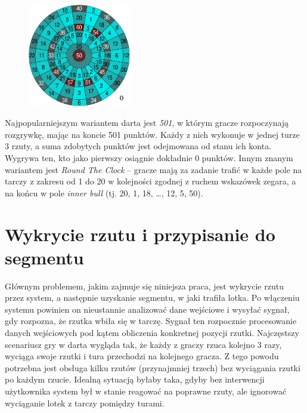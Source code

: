 \begin{figure}[h!]
\begin{center}
\includegraphics[width=0.4\textwidth]{obrazki/tarcza.pdf}
\end{center}
\label{tarcza_punktacja}
\end{figure} 

Najpopularniejszym wariantem darta jest \textit{501}, w którym gracze rozpoczynają rozgrywkę, mając na koncie 501 punktów. Każdy z nich wykonuje w jednej turze 3 rzuty, a suma zdobytych punktów jest odejmowana od stanu ich konta. Wygrywa ten, kto jako pierwszy osiągnie dokładnie 0 punktów. Innym znanym wariantem jest \textit{Round The Clock} -- gracze mają za zadanie trafić w każde pole na tarczy z zakresu od 1 do 20 w kolejności zgodnej z ruchem wskazówek zegara, a na końcu w pole \textit{inner bull} (tj. 20, 1, 18, \ldots, 12, 5, 50).

\section{Wykrycie rzutu i przypisanie do segmentu} \label{reprezentacja_pola}
Głównym problemem, jakim zajmuje się niniejsza praca, jest wykrycie rzutu przez system, a następnie uzyskanie segmentu, w jaki trafiła lotka. Po włączeniu systemu powinien on nieustannie analizować dane wejściowe i wysyłać sygnał, gdy rozpozna, że rzutka wbiła się w tarczę. Sygnał ten rozpocznie procesowanie danych wejściowych pod kątem obliczenia konkretnej pozycji rzutki. Najczęstszy scenariusz gry w darta wygląda tak, że każdy z graczy rzuca kolejno 3 razy, wyciąga swoje rzutki i tura przechodzi na kolejnego gracza. Z tego powodu potrzebna jest obsługa kilku rzutów (przynajmniej trzech) bez wyciągania rzutki po każdym rzucie. Idealną sytuacją byłaby taka, gdyby bez interwencji użytkownika system był w stanie reagować na poprawne rzuty, ale ignorować wyciąganie lotek z tarczy pomiędzy turami.

